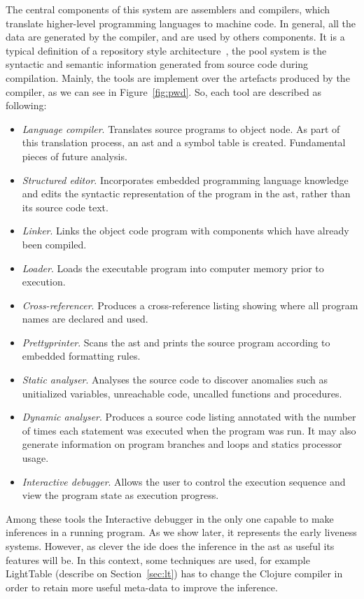 The central components of this system are assemblers and compilers, which translate higher-level programming languages to machine code. In general, all the data are generated by the compiler, and are used by others components. It is a typical definition of a repository style architecture~\cite[chap.~4.5]{clements2002documenting}, the pool system is the syntactic and semantic information generated from source code during compilation. Mainly, the tools are implement over the artefacts produced by the compiler, as we can see in Figure~\ref{fig:pwd}. So, each tool are described as following:

\begin{itemize}
 \item \textit{Language compiler}. Translates source programs to object node. As part of this translation process, an \ac{ast} and a symbol table is created. Fundamental pieces of future analysis.
 \item \textit{Structured editor}. Incorporates embedded programming language knowledge and edits the syntactic representation of the program in the \ac{ast}, rather than its source code text.
 \item \textit{Linker}. Links the object code program with components which have already been compiled.
 \item \textit{Loader}. Loads the executable program into computer memory prior to execution.
 \item \textit{Cross-referencer}. Produces a cross-reference listing showing where all program names are declared and used.
 \item \textit{Prettyprinter}. Scans the \ac{ast} and prints the source program according to embedded formatting rules.
 \item \textit{Static analyser}. Analyses the source code to discover anomalies such as unitialized variables, unreachable code, uncalled functions and procedures.
 \item \textit{Dynamic analyser}. Produces a source code listing annotated with the number of times each statement was executed when the program was run. It may also generate information on program branches and loops and statics processor usage.
 \item \textit{Interactive debugger}. Allows the user to control the execution sequence and view the program state as execution progress.
\end{itemize}

Among these tools the Interactive debugger in the only one capable to make inferences in a running program. As we show later, it represents the early liveness systems. However, as clever the \ac{ide} does the inference in the \ac{ast} as useful its features will be. In this context, some techniques are used, for example LightTable (describe on Section~\ref{sec:lt}) has to change the Clojure compiler in order to retain more useful meta-data to improve the inference. 

